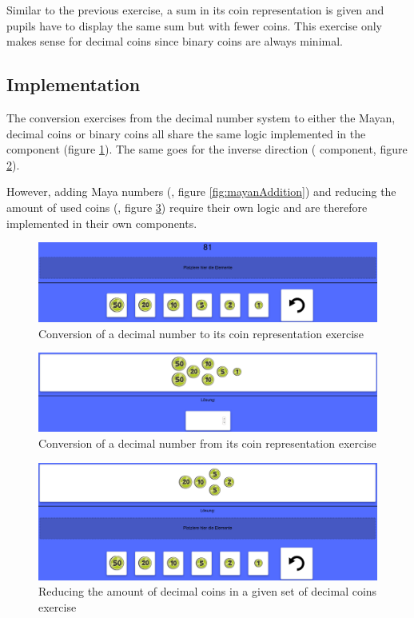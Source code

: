 Similar to the previous exercise, a sum in its coin representation is given and pupils have to display the same sum but with fewer coins. This exercise only makes sense for decimal coins since binary coins are always minimal.

\subsection{Implementation}

The conversion exercises from the decimal number system to either the Mayan, decimal coins or binary coins all share the same logic implemented in the  component (figure \ref{fig:coinsTo}).
The same goes for the inverse direction ( component, figure \ref{fig:coinsFrom}).

However, adding Maya numbers (, figure \ref{fig:mayanAddition}) and reducing the amount of used coins (, figure \ref{fig:coinsSwap}) require their own logic and are therefore implemented in their own components.

\begin{figure} 
  \centering
  \includegraphics[width=1.0 \columnwidth]{figures/coins_to.png}
  \caption{Conversion of a decimal number to its coin representation exercise} 
  \label{fig:coinsTo} 
\end{figure}

\begin{figure} 
  \centering
  \includegraphics[width=1.0 \columnwidth]{figures/coins_from.png}
  \caption{Conversion of a decimal number from its coin representation exercise} 
  \label{fig:coinsFrom} 
\end{figure}

\begin{figure} 
  \centering
  \includegraphics[width=1.0 \columnwidth]{figures/coins_swap.png}
  \caption{Reducing the amount of decimal coins in a given set of decimal coins exercise} 
  \label{fig:coinsSwap} 
\end{figure}

